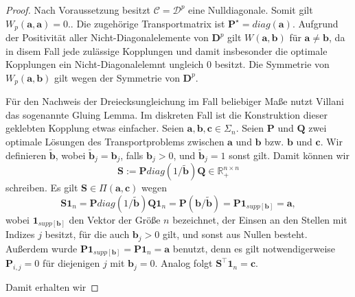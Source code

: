 \documentclass[11pt,a4paper]{article}
\numberwithin{equation}{section}
\begin{document}
	\begin{proof}
		Nach Voraussetzung besitzt $\mathcal{C} = \mathcal{D}^p$ eine Nulldiagonale. Somit gilt $W_p(\boldsymbol{a},\boldsymbol{a}) =0.$. Die zugehörige Transportmatrix ist $\boldsymbol{P}^\star = diag(\boldsymbol{a})$. Aufgrund der Positivität aller Nicht-Diagonalelemente von $\boldsymbol{D}^p$ gilt $W(\boldsymbol{a},\boldsymbol{b})$ für $\boldsymbol{a} \neq \boldsymbol{b}$, da in disem Fall jede zulässige Kopplungen und damit insbesonder die optimale Kopplungen ein Nicht-Diagonalelemnt ungleich $0$ besitzt. Die Symmetrie von $W_p(\boldsymbol{a},\boldsymbol{b})$ gilt wegen der Symmetrie von $\boldsymbol{D}^p$.
		
		Für den Nachweis der Dreiecksungleichung im Fall beliebiger Maße nutzt Villani \cite{villani2003topics} das sogenannte Gluing Lemma. Im diskreten Fall ist die Konstruktion dieser geklebten Kopplung etwas einfacher. Seien $\boldsymbol{a}, \boldsymbol{b}, \boldsymbol{c} \in \Sigma_n$. Seien $\boldsymbol{P}$ und $\boldsymbol{Q}$ zwei optimale Lösungen des Transportproblems zwischen $\boldsymbol{a}$ und $\boldsymbol{b}$ bzw. $\boldsymbol{b}$ und $\boldsymbol{c}$.
		Wir definieren $\tilde{\boldsymbol{b}}$, wobei $\tilde{\boldsymbol{b}}_j = \boldsymbol{b}_j$, falls $\boldsymbol{b}_j > 0$, und $\tilde{\boldsymbol{b}}_j = 1$ sonst gilt. Damit können wir 
		\begin{equation}
		\boldsymbol{S}:= \boldsymbol{P} diag(1/\tilde{\boldsymbol{b}})\boldsymbol{Q} \in \mathbb{R}_+^{n\times n}
		\end{equation}
		schreiben. Es gilt $\boldsymbol{S} \in \Pi (\boldsymbol{a}, \boldsymbol{c})$ wegen
		\begin{equation}
		\boldsymbol{S}\boldsymbol{1}_n = \boldsymbol{P} diag(1/\tilde{\boldsymbol{b}})\boldsymbol{Q}\boldsymbol{1}_n = \boldsymbol{P}(\boldsymbol{b}/\tilde{\boldsymbol{b}}) = \boldsymbol{P}\boldsymbol{1}_{supp[\boldsymbol{b}]} = \boldsymbol{a},	 	\end{equation}
		wobei $\boldsymbol{1}_{supp[\boldsymbol{b}]}$ den Vektor der Größe $n$ bezeichnet, der Einsen an den Stellen mit Indizes $j$ besitzt, für die auch $\boldsymbol{b}_j >0$ gilt, und sonst aus Nullen besteht.
		Außerdem wurde $\boldsymbol{P}\boldsymbol{1}_{supp[\boldsymbol{b}]} = \boldsymbol{P}\boldsymbol{1}_n = \boldsymbol{a}$ benutzt, denn es gilt notwendigerweise $\boldsymbol{P}_{i,j} = 0$ für diejenigen $j$ mit $\boldsymbol{b}_j = 0$. Analog folgt $\boldsymbol{S}^\top\boldsymbol{1}_n = \boldsymbol{c}$.
		
		Damit erhalten wir
		

\end{proof}
\end{document}
